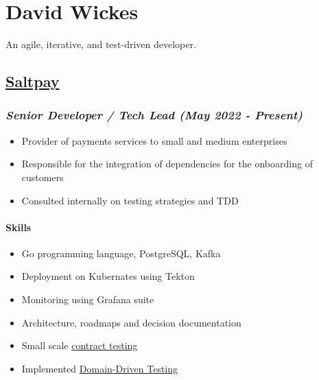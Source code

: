 \hypertarget{david-wickes}{%
\section{David Wickes}\label{david-wickes}}

An agile, iterative, and test-driven developer.

\hypertarget{saltpay}{%
\subsection{\texorpdfstring{\href{https://www.saltpay.co/}{Saltpay}}{Saltpay}}\label{saltpay}}

\hypertarget{saltpay-role}{%
\subsubsection{\texorpdfstring{\emph{Senior Developer / Tech Lead (May
2022 -
Present)}}{Senior Developer / Tech Lead (May 2022 - Present)}}\label{saltpay-role}}

\begin{itemize}
\tightlist
\item
  Provider of payments services to small and medium enterprises
\item
  Responsible for the integration of dependencies for the onboarding of
  customers
\item
  Consulted internally on testing strategies and TDD
\end{itemize}

\hypertarget{skills-saltpay}{%
\paragraph{Skills}\label{skills-saltpay}}

\begin{itemize}
\tightlist
\item
  Go programming language, PostgreSQL, Kafka
\item
  Deployment on Kubernates using Tekton
\item
  Monitoring using Grafana suite
\item
  Architecture, roadmaps and decision documentation
\item
  Small scale
  \href{https://martinfowler.com/bliki/ContractTest.html}{contract
  testing}
\item
  Implemented
  \href{http://www.natpryce.com/articles/000819.html}{Domain-Driven
  Testing}
\end{itemize}


